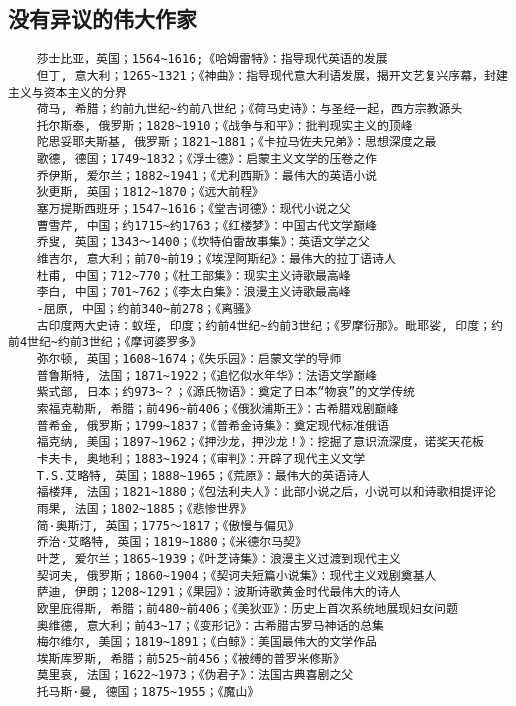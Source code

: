 \documentclass[UTF8]{../RepresentationUniverse}
\begin{document}
\subsection{没有异议的伟大作家}
\begin{lstlisting}
    莎士比亚，英国；1564~1616;《哈姆雷特》：指导现代英语的发展
    但丁, 意大利；1265~1321；《神曲》：指导现代意大利语发展，揭开文艺复兴序幕，封建主义与资本主义的分界
    荷马, 希腊；约前九世纪~约前八世纪；《荷马史诗》：与圣经一起，西方宗教源头
    托尔斯泰, 俄罗斯；1828~1910；《战争与和平》：批判现实主义的顶峰
    陀思妥耶夫斯基, 俄罗斯；1821~1881；《卡拉马佐夫兄弟》：思想深度之最
    歌德, 德国；1749~1832；《浮士德》：启蒙主义文学的压卷之作
    乔伊斯, 爱尔兰；1882~1941；《尤利西斯》：最伟大的英语小说
    狄更斯, 英国；1812~1870；《远大前程》
    塞万提斯西班牙；1547~1616；《堂吉诃德》：现代小说之父
    曹雪芹, 中国；约1715~约1763；《红楼梦》：中国古代文学巅峰
    乔叟, 英国；1343～1400；《坎特伯雷故事集》：英语文学之父
    维吉尔, 意大利；前70~前19；《埃涅阿斯纪》：最伟大的拉丁语诗人
    杜甫, 中国；712~770；《杜工部集》：现实主义诗歌最高峰
    李白, 中国；701~762；《李太白集》：浪漫主义诗歌最高峰
    -屈原, 中国；约前340~前278；《离骚》
    古印度两大史诗：蚁垤, 印度；约前4世纪~约前3世纪；《罗摩衍那》。毗耶娑, 印度；约前4世纪~约前3世纪；《摩诃婆罗多》
    弥尔顿, 英国；1608~1674；《失乐园》：启蒙文学的导师
    普鲁斯特, 法国；1871~1922；《追忆似水年华》：法语文学巅峰
    紫式部, 日本；约973~？；《源氏物语》：奠定了日本“物哀”的文学传统
    索福克勒斯, 希腊；前496~前406；《俄狄浦斯王》：古希腊戏剧巅峰
    普希金, 俄罗斯；1799~1837；《普希金诗集》：奠定现代标准俄语
    福克纳, 美国；1897~1962；《押沙龙，押沙龙！》：挖掘了意识流深度，诺奖天花板
    卡夫卡, 奥地利；1883~1924；《审判》：开辟了现代主义文学
    T.S.艾略特, 英国；1888~1965；《荒原》：最伟大的英语诗人
    福楼拜, 法国；1821~1880；《包法利夫人》：此部小说之后，小说可以和诗歌相提评论
    雨果, 法国；1802~1885；《悲惨世界》
    简·奥斯汀, 英国；1775～1817；《傲慢与偏见》
    乔治·艾略特, 英国；1819~1880；《米德尔马契》
    叶芝, 爱尔兰；1865~1939；《叶芝诗集》：浪漫主义过渡到现代主义
    契诃夫, 俄罗斯；1860~1904；《契诃夫短篇小说集》：现代主义戏剧奠基人
    萨迪, 伊朗；1208~1291；《果园》：波斯诗歌黄金时代最伟大的诗人
    欧里庇得斯, 希腊；前480~前406；《美狄亚》：历史上首次系统地展现妇女问题
    奥维德, 意大利；前43~17；《变形记》：古希腊古罗马神话的总集
    梅尔维尔, 美国；1819~1891；《白鲸》：美国最伟大的文学作品
    埃斯库罗斯, 希腊；前525~前456；《被缚的普罗米修斯》
    莫里哀, 法国；1622~1973；《伪君子》：法国古典喜剧之父
    托马斯·曼, 德国；1875~1955；《魔山》

\end{lstlisting}
\end{document}
